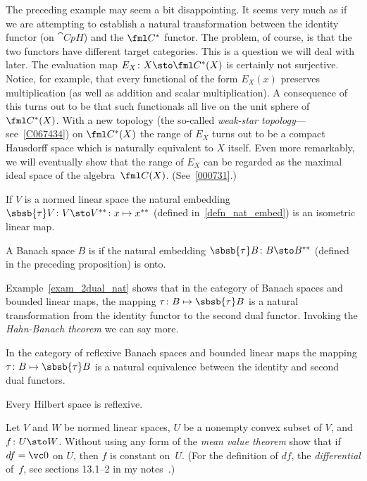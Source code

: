 The preceding example may seem a bit disappointing.  It seems very much as if we are
attempting to establish a natural transformation between the identity functor (on
$\cat{CpH}$) and the $\fml C^*$ functor.  The problem, of course, is that the two
functors have different target categories.  This is a question we will deal with later.
The evaluation map $E_X\colon X \sto \fml C^*(X)$ is certainly not surjective.
Notice, for example, that every functional of the form $E_X(x)$
preserves multiplication (as well as addition and scalar multiplication). A consequence
of this turns out to be that such functionals all live on the unit sphere of $\fml C^*(X)$.
With a new topology (the so-called \emph{weak-star topology}---see~\ref{C067434}) on
$\fml C^*(X)$ the range of $E_X$ turns out to be a compact Hausdorff space which is naturally
equivalent to $X$ itself.  Even more remarkably, we will eventually show that the range of $E_X$
can be regarded as the maximal ideal space of the algebra~$\fml C(X)$. (See~\ref{000731}.)

\begin{prop}\label{C067137} If $V$ is a normed linear space the natural embedding
$\sbsb{\tau}V \colon V \sto V^{**}\colon x \mapsto x^{**}$ (defined in~\ref{defn_nat_embed})
is an isometric linear map.
\end{prop}

\begin{defn} A Banach space $B$ is
 if the natural embedding $\sbsb{\tau}B\colon B \sto B^{**}$ (defined in the preceding proposition) is onto.
\end{defn}

Example~\ref{exam_2dual_nat} shows that in the category of Banach spaces and bounded linear
maps, the mapping $\tau\colon B \mapsto \sbsb{\tau}B$ is a natural transformation from the
identity functor to the second dual functor.  Invoking the \emph{Hahn-Banach theorem} we can
say more.

\begin{prop} In the category of reflexive Banach spaces and bounded linear maps the mapping
$\tau\colon B \mapsto \sbsb{\tau}B$ is a natural equivalence between the identity and second
dual functors.
\end{prop}

\begin{exam} Every Hilbert space is reflexive.
\end{exam}

\begin{exer} Let $V$ and $W$ be normed linear spaces, $U$ be a nonempty convex subset of $V$,
and $f \colon U \sto W$.  Without using any form of the \emph{mean value theorem} show
that if $df = \vc 0$ on $U$, then $f$ is constant on~$U$.  (For the definition of $df$, the
\emph{differential} of~$f$, see sections 13.1--2 in my notes~\cite{Erdman:2007}.)
\end{exer}

